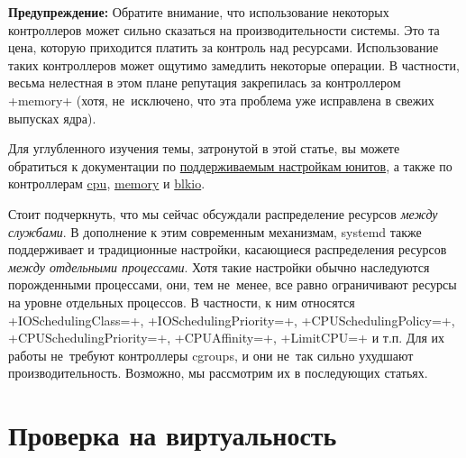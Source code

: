 \documentclass[10pt,oneside,a4paper]{article}
\newenvironment{caveat}[1][]{\smallskip\par\textbf{Предупреждение#1: }}%
	{\smallskip\par}
\begin{document}
\begin{caveat}
	Обратите внимание, что использование некоторых контроллеров может сильно
	сказаться на производительности системы. Это та цена, которую приходится
	платить за контроль над ресурсами. Использование таких контроллеров
	может ощутимо замедлить некоторые операции. В частности, весьма
	нелестная в этом плане репутация закрепилась за контроллером +memory+
	(хотя, не~исключено, что эта проблема уже исправлена в свежих выпусках
	ядра).
\end{caveat}

Для углубленного изучения темы, затронутой в этой статье, вы можете обратиться к
документации по
\href{http://0pointer.de/public/systemd-man/systemd.exec.html}{поддерживаемым
настройкам юнитов}, а также по контроллерам 
\href{http://www.kernel.org/doc/Documentation/scheduler/sched-design-CFS.txt}{cpu},
\href{http://www.kernel.org/doc/Documentation/cgroups/memory.txt}{memory} и
\href{http://www.kernel.org/doc/Documentation/cgroups/blkio-controller.txt}{blkio}.

Стоит подчеркнуть, что мы сейчас обсуждали распределение ресурсов \emph{между
службами}. В дополнение к этим современным механизмам, systemd также
поддерживает и традиционные настройки, касающиеся распределения ресурсов
\emph{между отдельными процессами}. Хотя такие настройки обычно наследуются
порожденными процессами, они, тем не~менее, все равно ограничивают ресурсы
на уровне отдельных процессов. В частности, к ним относятся +IOSchedulingClass=+,
+IOSchedulingPriority=+, +CPUSchedulingPolicy=+, +CPUSchedulingPriority=+,
+CPUAffinity=+, +LimitCPU=+ и т.п. Для их работы не~требуют контроллеры cgroups,
и они не~так сильно ухудшают производительность. Возможно, мы рассмотрим их в
последующих статьях.

\section{Проверка на виртуальность}
\end{document}
